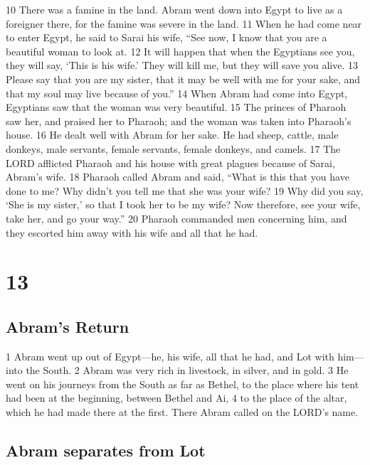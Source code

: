 {10} There was a famine in the land. Abram went down into Egypt to live
as a foreigner there, for the famine was severe in the land. {11} When
he had come near to enter Egypt, he said to Sarai his wife, ``See now, I
know that you are a beautiful woman to look at. {12} It will happen that
when the Egyptians see you, they will say, `This is his wife.' They will
kill me, but they will save you alive. {13} Please say that you are my
sister, that it may be well with me for your sake, and that my soul may
live because of you.'' {14} When Abram had come into Egypt, Egyptians
saw that the woman was very beautiful. {15} The princes of Pharaoh saw
her, and praised her to Pharaoh; and the woman was taken into Pharaoh's
house. {16} He dealt well with Abram for her sake. He had sheep, cattle,
male donkeys, male servants, female servants, female donkeys, and
camels. {17} The LORD afflicted Pharaoh and his house with great plagues
because of Sarai, Abram's wife. {18} Pharaoh called Abram and said,
``What is this that you have done to me? Why didn't you tell me that she
was your wife? {19} Why did you say, `She is my sister,' so that I took
her to be my wife? Now therefore, see your wife, take her, and go your
way.'' {20} Pharaoh commanded men concerning him, and they escorted him
away with his wife and all that he had.

\hypertarget{section-12}{%
\section{13}\label{section-12}}

\hypertarget{abrams-return}{%
\subsection{Abram's Return}\label{abrams-return}}

{1} Abram went up out of Egypt---he, his wife, all that he had, and Lot
with him---into the South. {2} Abram was very rich in livestock, in
silver, and in gold. {3} He went on his journeys from the South as far
as Bethel, to the place where his tent had been at the beginning,
between Bethel and Ai, {4} to the place of the altar, which he had made
there at the first. There Abram called on the LORD's name.

\hypertarget{abram-separates-from-lot}{%
\subsection{Abram separates from Lot}\label{abram-separates-from-lot}}

